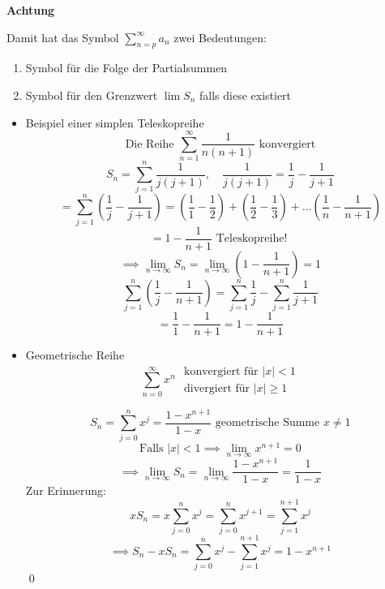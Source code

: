 \documentclass[fleqn]{scrbook}
\newcommand{\sumNI}{\sum_{n=0}^{\infty}}
\newcommand{\sumOI}{\sum_{n=1}^{\infty}}
\renewenvironment{proof}{{\bfseries Beweis }}{\qed}
\newenvironment{example}{{\bfseries Beispiel }}{}
\begin{document}
\textbf{Achtung}

Damit hat das Symbol $\sum_{n=p}^\infty a_n$ zwei Bedeutungen:

\begin{enumerate}
  \item Symbol für die Folge der Partialsummen
  \item Symbol für den Grenzwert $\lim S_n$ falls diese existiert
\end{enumerate}

\begin{example}

  \begin{itemize}
    \item Beispiel einer simplen Teleskopreihe
      \[\text{Die Reihe } \sumOI \frac{1}{n(n+1)} \text{ konvergiert}\]
      \[S_n = \sum_{j=1}^n \frac{1}{j(j+1)}, \quad \frac{1}{j(j+1)} = \frac{1}{j}-\frac{1}{j+1}\]
      \[= \sum_{j=1}^n \left( \frac{1}{j}-\frac{1}{j+1} \right) = \left( \frac{1}{1}-\frac{1}{2} \right) + \left( \frac{1}{2}-\frac{1}{3} \right) + \ldots \left( \frac{1}{n}-\frac{1}{n+1} \right) \]   
      \[= 1 - \frac{1}{n+1} \text{ Teleskopreihe! }\]
      \[\implies \lim_{n \to \infty} S_n = \lim_{n\to \infty} \left(1- \frac{1}{n+1} \right) =1\]
      \[\sum_{j=1}^n \left( \frac{1}{j} - \frac{1}{n+1} \right)  = \sum_{j=1}^n \frac{1}{j} - \sum_{j=1}^n \frac{1}{j+1}\]
      \[= \frac{1}{1} - \frac{1}{n+1} = 1-\frac{1}{n+1}\]
    \item Geometrische Reihe 
     \[ \sumNI x^n
       \begin{array}{l}
         \text{ konvergiert für } |x| < 1 \\
         \text{ divergiert für } |x| \geq 1   
       \end{array}       
     \]
     
     \begin{proof}
       \[S_n = \sum_{j=0}^n x^j = \frac{1-x^{n+1}}{1-x} \text{ geometrische Summe } x \neq 1\]
       \[\text{Falls } |x|<1 \implies \lim_{n\to \infty} x^{n+1} = 0 \]
       \[\implies \lim_{n \to \infty} S_n = \lim_{n \to \infty} \frac{1-x^{n+1}}{1-x}=\frac{1}{1-x}\]
       Zur Erinnerung:
       \[x S_n = x \sum_{j=0}^n x^j = \sum_{j=0}^n x^{j+1} = \sum_{j=1}^{n+1} x^{j}\]
       \[\implies S_n-x S_n = \sum_{j=0}^n x^j - \sum_{j=1}^{n+1} x^{j} = 1 - x^{n+1}\]
     \end{proof}
  \end{itemize}

\end{example}
\end{document}
